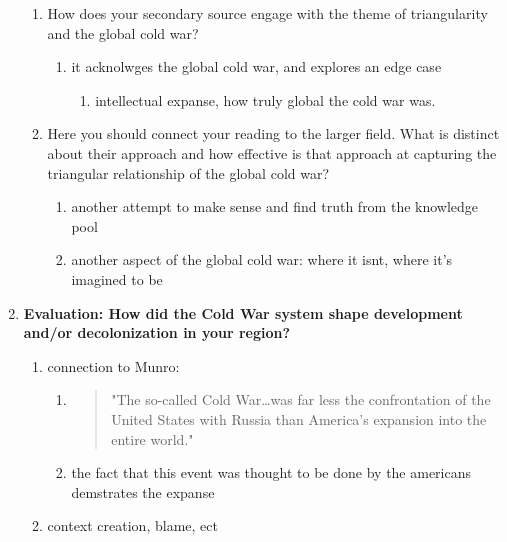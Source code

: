 \documentclass[letterpaper]{article}
\begin{document}
\begin{enumerate}
\begin{enumerate}
\item How does your secondary source engage with the theme of
triangularity and the global cold war?

\begin{enumerate}
\item it acknolwges the global cold war, and explores an edge case

\begin{enumerate}
\item intellectual expanse, how truly global the cold war was.
\end{enumerate}
\end{enumerate}

\item Here you should connect your reading to the larger field. What is
distinct about their approach and how effective is that approach
at capturing the triangular relationship of the global cold war?

\begin{enumerate}
\item another attempt to make sense and find truth from the knowledge
pool
\item another aspect of the global cold war: where it isnt, where
it's imagined to be
\end{enumerate}
\end{enumerate}

\item \textbf{Evaluation: How did the Cold War system shape development and/or
decolonization in your region?}

\begin{enumerate}
\item connection to Munro:

\begin{enumerate}
\item \begin{quote}
"The so-called Cold War\ldots{}was far less the confrontation of
the United States with Russia than America's expansion into
the entire world."
\end{quote}

\item the fact that this event was thought to be done by the
americans demstrates the expanse
\end{enumerate}

\item context creation, blame, ect
\end{enumerate}
\end{enumerate}
\end{document}
